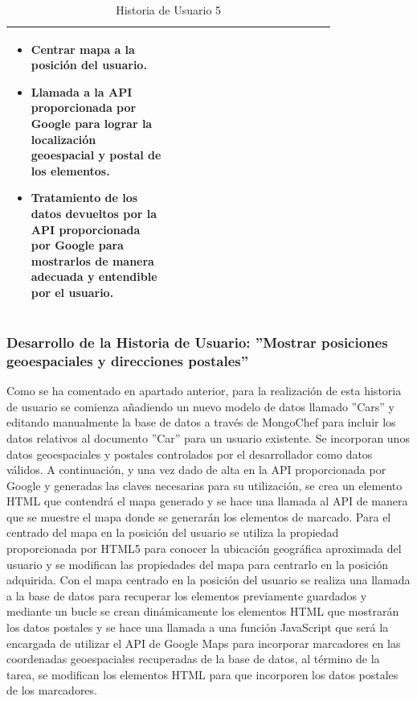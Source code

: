 \begin{table}[H]
\begin{tabular}{p{0.4\linewidth}p{0.4\linewidth}}
{\begin{minipage}{12cm}
\begin{itemize}
	    			\item Centrar mapa a la posición del usuario.
	    			\item Llamada a la API proporcionada por Google para lograr la localización geoespacial y postal de los elementos.
	    			\item Tratamiento de los datos devueltos por la API proporcionada por Google para mostrarlos de manera adecuada y entendible por el usuario.
				\end{itemize}
			  	\vskip 4pt
		 	\end{minipage}
		} \\																				
	    \hline
	  \end{tabular}
	  \caption{Historia de Usuario 5}
	\end{table}
		
	\subsubsection{Desarrollo de la Historia de Usuario: ''Mostrar posiciones geoespaciales y direcciones postales''}
	Como se ha comentado en apartado anterior, para la realización de esta historia de usuario se comienza añadiendo un nuevo modelo de datos llamado ''Cars'' y editando manualmente la base de datos a través de MongoChef para incluir los datos relativos al documento ''Car'' para un usuario existente. Se incorporan unos datos geoespaciales y postales controlados por el desarrollador como datos válidos.
	A continuación, y una vez dado de alta en la API proporcionada por Google y generadas las claves necesarias para su utilización, se crea un elemento HTML que contendrá el mapa generado y se hace una llamada al API de manera que se muestre el mapa donde se generarán los elementos de marcado. Para el centrado del mapa en la posición del usuario se utiliza la propiedad proporcionada por HTML5 para conocer la ubicación geográfica aproximada del usuario y se modifican las propiedades del mapa para centrarlo en la posición adquirida.
	Con el mapa centrado en la posición del usuario se realiza una llamada a la base de datos para recuperar los elementos previamente guardados y mediante un bucle se crean dinámicamente los elementos HTML que mostrarán los datos postales  y se hace una llamada a una función JavaScript que será la encargada de utilizar el API de Google Maps para incorporar marcadores en las coordenadas geoespaciales recuperadas de la base de datos, al término de la tarea, se modifican los elementos HTML para que incorporen los datos postales de los marcadores.
	
